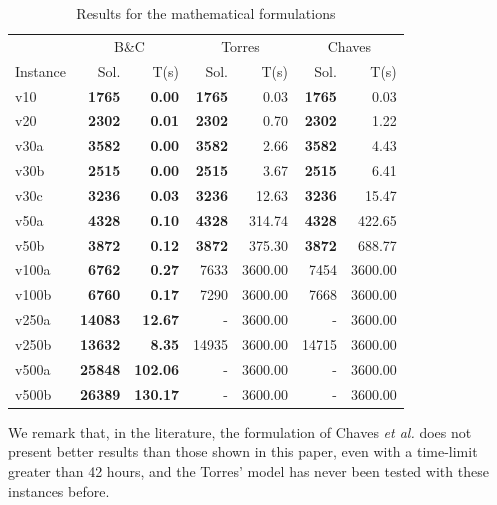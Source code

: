 \documentclass{ro}
\begin{document}
\begin{table}[!ht]
	\centering
	\caption{Results for the mathematical formulations}
	\label{tab:chaves-for}
	\begin{tabular}{lrrrrrr}
		\hline
		& \multicolumn{2}{c}{B\&C} & \multicolumn{2}{c}{Torres} & \multicolumn{2}{c}{Chaves } \\ 
		Instance & Sol. & T(s) & Sol. & T(s) & Sol. & T(s) \\\hline
		v10 & \textbf{1765} & \textbf{0.00} & \textbf{1765} & 0.03 & \textbf{1765} & 0.03 \\
		v20 & \textbf{2302} & \textbf{0.01} & \textbf{2302} & 0.70 & \textbf{2302} & 1.22 \\
		v30a & \textbf{3582} & \textbf{0.00} & \textbf{3582} & 2.66 & \textbf{3582} & 4.43 \\
		v30b & \textbf{2515} & \textbf{0.00} & \textbf{2515} & 3.67 & \textbf{2515} & 6.41 \\
		v30c & \textbf{3236} & \textbf{0.03} & \textbf{3236} & 12.63 & \textbf{3236} & 15.47 \\
		v50a & \textbf{4328} & \textbf{0.10} & \textbf{4328} & 314.74 & \textbf{4328} & 422.65 \\
		v50b & \textbf{3872} & \textbf{0.12} & \textbf{3872} & 375.30 & \textbf{3872} & 688.77 \\
		v100a & \textbf{6762} & \textbf{0.27} & 7633 & 3600.00 & 7454 & 3600.00 \\
		v100b & \textbf{6760} & \textbf{0.17} & 7290 & 3600.00 & 7668 & 3600.00 \\
		v250a & \textbf{14083} & \textbf{12.67} & - & 3600.00 & - & 3600.00 \\
		v250b & \textbf{13632} & \textbf{8.35} & 14935 & 3600.00 & 14715 & 3600.00 \\
		v500a & \textbf{25848} & \textbf{102.06} & - & 3600.00 & - & 3600.00 \\
		v500b & \textbf{26389} & \textbf{130.17} & - & 3600.00 & - & 3600.00 \\
		\hline
	\end{tabular}
\end{table}




We remark that, in the literature, the formulation of Chaves \textit{et al.} \cite{chaves2005hybrid} does not present better results than those shown in this paper, even with a time-limit greater than 42 hours, and the Torres' model has never been tested with these instances before.
\end{document}

